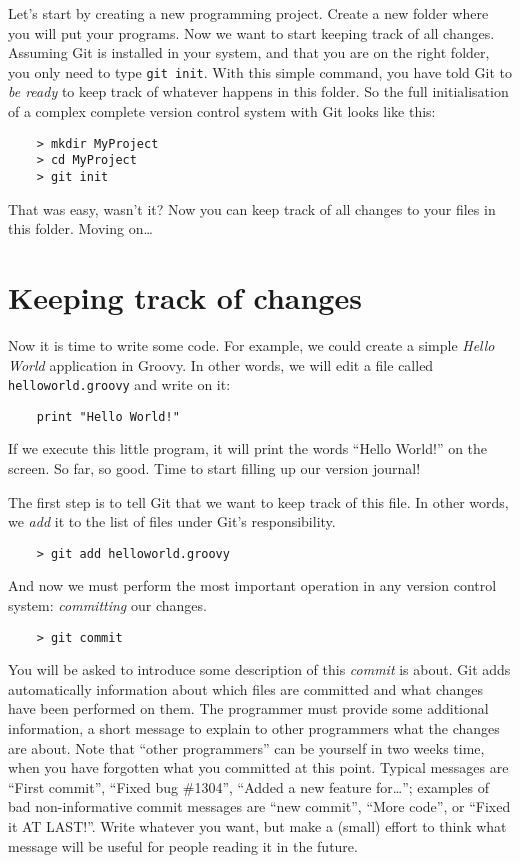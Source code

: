 Let's start by creating a new programming project. Create a new folder
where you will put your programs. Now we want to start keeping track
of all changes. Assuming Git is installed in your system, and that you
are on the right folder, you only need to type \verb+git init+. With
this simple command, you have told Git to \emph{be ready} to keep 
track of whatever happens in this folder. So the full initialisation
of a complex complete version control system with Git looks like this: 

\begin{verbatim}
    > mkdir MyProject
    > cd MyProject
    > git init
\end{verbatim}

That was easy, wasn't it? Now you can keep track of all changes to
your files in this folder. Moving on\ldots

\section{Keeping track of changes}
\label{sec:keep-track-chang}

Now it is time to write some code. For example, we could create a
simple \emph{Hello World} application in Groovy. In other words, we
will edit a file called \verb+helloworld.groovy+ and write on it:

\begin{verbatim}
    print "Hello World!"
\end{verbatim}

If we execute this little program, it will print the words ``Hello
World!'' on the screen. So far, so good. Time to start filling up our
version journal! 

The first step is to tell Git that we want to keep track of this
file. In other words, we \emph{add} it to the list of files under
Git's responsibility. 

\begin{verbatim}
    > git add helloworld.groovy
\end{verbatim}

And now we must perform the most important operation in any version control
system: \emph{committing} our changes. 

\begin{verbatim}
    > git commit
\end{verbatim}

You will be asked to introduce some description of this \emph{commit}
is about. Git adds automatically information about which files are
committed and what changes have been performed on them. The programmer
must provide some additional information, a short message to explain
to other programmers what the changes are about. Note that ``other
programmers'' can be yourself in two weeks time, when you have
forgotten what you committed at this point. Typical messages are
``First commit'', ``Fixed bug \#1304'', ``Added a new feature
for\ldots''; examples of bad non-informative commit messages are ``new
commit'', ``More code'', or ``Fixed it AT LAST!''. Write whatever you
want, but make a (small) effort to think what message will be useful
for people reading it in the future.


